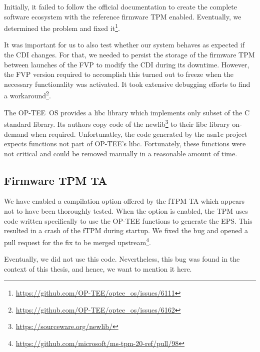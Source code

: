 
Initially, it failed to follow the official documentation to create the complete software ecosystem with the reference firmware TPM enabled.
Eventually, we determined the problem and fixed it\footnote{\url{https://github.com/OP-TEE/optee_os/issues/6111}}.


It was important for us to also test whether our system behaves as expected if the CDI changes.
For that, we needed to persist the storage of the firmware TPM between launches of the FVP to modify the CDI during its downtime.
However, the FVP version required to accomplish this turned out to freeze when the necessary functionality was activated.
It took extensive debugging efforts to find a workaround\footnote{\url{https://github.com/OP-TEE/optee_os/issues/6162}}.

The OP-TEE~OS provides a libc library which implements only subset of the C standard library.
Its authors copy code of the newlib\footnote{\url{https://sourceware.org/newlib/}} to their libc library on-demand when required.
Unfortunatley, the code generated by the asn1c project expects functions not part of OP-TEE's libc.
Fortunately, these functions were not critical and could be removed manually in a reasonable amount of time.

\subsection{Firmware TPM TA}

We have enabled a compilation option offered by the fTPM TA which appears not to have been thoroughly tested.
When the option is enabled, the TPM uses code written specifically to use the OP-TEE functions to generate the EPS\@.
This resulted in a crash of the fTPM during startup.
We fixed the bug and opened a pull request for the fix to be merged upstream\footnote{\url{https://github.com/microsoft/ms-tpm-20-ref/pull/98}}.

Eventually, we did not use this code.
Nevertheless, this bug was found in the context of this thesis, and hence, we want to mention it here.
